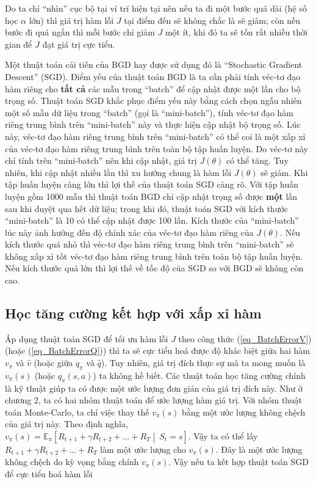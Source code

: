 	Do ta chỉ ``nhìn'' cục bộ tại ví trí hiện tại nên nếu ta đi một bước quá dài (hệ số học $\alpha$ lớn) thì giá trị hàm lỗi $J$ tại điểm đến sẽ không chắc là sẽ giảm;
	còn nếu bước đi quá ngắn thì mỗi bước chỉ giảm $J$ một ít, khi đó ta sẽ tốn rất nhiều thời gian để $J$ đạt giá trị cực tiểu.
	
	Một thuật toán cải tiến của BGD hay được sử dụng đó là ``Stochastic Gradient Descent'' (SGD).
	Điểm yếu của thuật toán BGD là ta cần phải tính véc-tơ đạo hàm riêng cho \textbf{tất cả} các mẫu trong ``batch'' để cập nhật được một lần cho bộ trọng số.
	Thuật toán SGD khắc phục điểm yếu này bằng cách chọn ngẫu nhiên một số mẫu dữ liệu trong ``batch'' (gọi là ``mini-batch''), tính véc-tơ đạo hàm riêng trung bình trên ``mini-batch'' này và thực hiện cập nhật bộ trọng số.
	Lúc này, véc-tơ đạo hàm riêng trung bình trên ``mini-batch'' có thể coi là một xấp xỉ của véc-tơ đạo hàm riêng trung bình trên toàn bộ tập huấn luyện.
	Do véc-tơ này chỉ tính trên ``mini-batch'' nên khi cập nhật, giá trị $J(\theta)$ có thể tăng.
	Tuy nhiên, khi cập nhật nhiều lần thì xu hướng chung là hàm lỗi $J(\theta)$ sẽ giảm.
	Khi tập huấn luyện càng lớn thì lợi thế của thuật toán SGD càng rõ.
	Với tập huấn luyện gồm 1000 mẫu thì thuật toán BGD chỉ cập nhật trọng số được \textbf{một} lần sau khi duyệt qua hết dữ liệu; trong khi đó, thuật toán SGD với kích thước ``mini-batch'' là 10 có thể cập nhật được 100 lần.
	Kích thước của ``mini-batch'' lúc này ảnh hưởng đến độ chính xác của véc-tơ đạo hàm riêng của $J(\theta)$.
	Nếu kích thước quá nhỏ thì véc-tơ đạo hàm riêng trung bình trên ``mini-batch'' sẽ không xấp xỉ tốt véc-tơ đạo hàm riêng trung bình trên toàn bộ tập huấn luyện.
	Nếu kích thước quá lớn thì lợi thế về tốc độ của SGD so với BGD sẽ không còn cao.
	
\subsection{Học tăng cường kết hợp với xấp xỉ hàm}
	Áp dụng thuật toán SGD để tối ưu hàm lỗi $J$ theo công thức (\ref{eq_BatchErrorV}) (hoặc (\ref{eq_BatchErrorQ})) thì ta sẽ cực tiểu hoá được độ khác biệt giữa hai hàm $v_{\pi}$ và $\hat{v}$ (hoặc giữa $q_{\pi}$ và $\hat{q}$).
	Tuy nhiên, giá trị đích thực sự mà ta mong muốn là $v_{\pi}(s)$ (hoặc $q_{\pi}(s,a)$) ta không hề biết.
	Các thuật toán học tăng cường chính là kỹ thuật giúp ta có được một ước lượng đơn giản của giá trị đích này.
	Như ở chương 2, ta có hai nhóm thuật toán để ước lượng hàm giá trị.
	Với nhóm thuật toán Monte-Carlo, ta chỉ việc thay thế $v_{\pi}(s)$ bằng một ước lượng không chệch của giá trị này.
	Theo định nghĩa, $v_{\pi}(s) = \mathbb{E}_{\pi}\left [R_{t+1} + \gamma R_{t + 2} + ... + R_T\middle|\ \mathit{S}_t= s\right ]$.
	Vậy ta có thể lấy $R_{t+1} + \gamma R_{t + 2} + ... + R_T$ làm một ước lượng cho $v_{\pi}(s)$.
	Đây là một ước lượng không chệch do kỳ vọng bằng chính $v_{\pi}(s)$.
	Vậy nếu ta kết hợp thuật toán SGD để cực tiểu hoá hàm lỗi 
	
